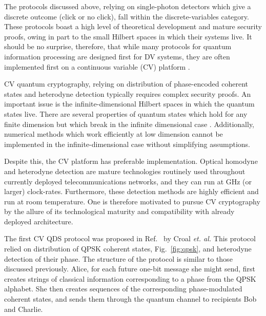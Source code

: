 The protocols discussed above, relying on single-photon detectors which give a discrete outcome (click or no click), fall within the discrete-variables category. These protocols boast a high level of theoretical development and mature security proofs, owing in part to the small Hilbert spaces in which their systems live. It should be no surprise, therefore, that while many protocols for quantum information processing are designed first for DV systems, they are often implemented first on a continuous variable (CV) platform \cite{Braunstein1998}.

CV quantum cryptography, relying on distribution of phase-encoded coherent states and heterodyne detection typically requires complex security proofs. An important issue is the infinite-dimensional Hilbert spaces in which the quantum states live. There are several properties of quantum states which hold for any finite dimension but which break in the infinite dimensional case \cite{Ranade2015}.  Additionally, numerical methods which work efficiently at low dimension \cite{Coles2016} cannot be implemented in the infinite-dimensional case without simplifying assumptions.

Despite this, the CV platform has preferable implementation. Optical homodyne and heterodyne detection are mature technologies routinely used throughout currently deployed telecommunications networks, and they can run at GHz (or larger) clock-rates. Furthermore, these detection methods are highly efficient and run at room temperature. One is therefore motivated to pursue CV cryptography by the allure of its technological maturity and compatibility with already deployed architecture.

The first CV QDS protocol was proposed in Ref.~\cite{Croal2016} by Croal \emph{et. al.} This protocol relied on distribution of QPSK coherent states, Fig.~\ref{fig:qpsk}, and heterodyne detection of their phase. The structure of the protocol is similar to those discussed previously. Alice, for each future one-bit message she might send, first creates strings of classical information corresponding to a phase from the QPSK alphabet. She then creates sequences of the corresponding phase-modulated coherent states, and sends them through the quantum channel to recipients Bob and Charlie.

